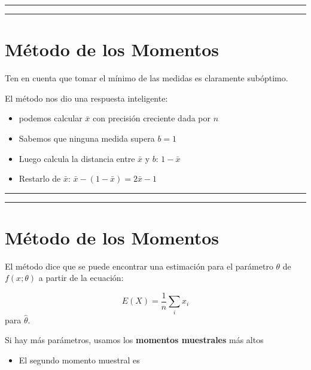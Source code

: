 \documentclass[
]{book}
\providecommand{\tightlist}{%
  \setlength{\itemsep}{0pt}\setlength{\parskip}{0pt}}
\begin{document}
\begin{center}\rule{0.5\linewidth}{0.5pt}\end{center}

\begin{center}\rule{0.5\linewidth}{0.5pt}\end{center}

\hypertarget{muxe9todo-de-los-momentos-5}{%
\section{Método de los Momentos}\label{muxe9todo-de-los-momentos-5}}

Ten en cuenta que tomar el mínimo de las medidas es claramente subóptimo.

El método nos dio una respuesta inteligente:

\begin{itemize}
\tightlist
\item
  podemos calcular \(\bar{x}\) con precisión creciente dada por \(n\)
\item
  Sabemos que ninguna medida supera \(b=1\)
\item
  Luego calcula la distancia entre \(\bar{x}\) y \(b\): \(1-\bar{x}\)
\item
  Restarlo de \(\bar{x}\): \(\bar{x}-(1-\bar{x})=2\bar{x}-1\)
\end{itemize}

\begin{center}\rule{0.5\linewidth}{0.5pt}\end{center}

\begin{center}\rule{0.5\linewidth}{0.5pt}\end{center}

\hypertarget{muxe9todo-de-los-momentos-6}{%
\section{Método de los Momentos}\label{muxe9todo-de-los-momentos-6}}

El método dice que se puede encontrar una estimación para el parámetro \(\theta\) de \(f(x;\theta)\) a partir de la ecuación:

\[E(X)=\frac{1}{n}\sum_i x_i\]
para \(\hat{\theta}\).

Si hay más parámetros, usamos los \textbf{momentos muestrales} más altos

\begin{itemize}
\tightlist
\item
  El segundo momento muestral es
\end{itemize}
\end{document}
